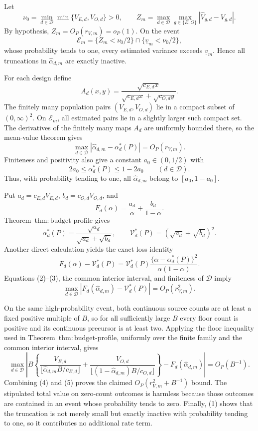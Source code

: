 Let
\[
 \nu_0=\min_{d\in\mathcal D}\min\{V_{E,d},V_{O,d}\}>0,
 \qquad
 Z_m=\max_{d\in\mathcal D}\max_{g\in\{E,O\}}
 |\widehat V_{g,d}-V_{g,d}|.
\]
By hypothesis, \(Z_m=O_P(r_{V,m})=o_P(1)\).  On the event
\[
 \mathcal E_m=\{Z_m<\nu_0/2\}\cap\{\underline v_m<\nu_0/2\}, \tag{1}
\]
whose probability tends to one, every estimated variance exceeds \(\underline v_m\).  Hence all truncations in \(\widehat\alpha_{d,m}\) are exactly inactive.

For each design define
\[
 A_d(x,y)=\frac{\sqrt{c_{E,d}x}}
 {\sqrt{c_{E,d}x}+\sqrt{c_{O,d}y}}.
\]
The finitely many population pairs \((V_{E,d},V_{O,d})\) lie in a compact subset of \((0,\infty)^2\).  On \(\mathcal E_m\), all estimated pairs lie in a slightly larger such compact set.  The derivatives of the finitely many maps \(A_d\) are uniformly bounded there, so the mean-value theorem gives
\[
 \max_{d\in\mathcal D}
 |\widehat\alpha_{d,m}-\alpha_d^*(P)|=O_P(r_{V,m}).       \tag{2}
\]
Finiteness and positivity also give a constant \(a_0\in(0,1/2)\) with
\[
 2a_0\le\alpha_d^*(P)\le1-2a_0
 \qquad(d\in\mathcal D).
\]
Thus, with probability tending to one, all \(\widehat\alpha_{d,m}\) belong to \([a_0,1-a_0]\).

Put \(a_d=c_{E,d}V_{E,d}\), \(b_d=c_{O,d}V_{O,d}\), and
\[
 F_d(\alpha)=\frac{a_d}{\alpha}+\frac{b_d}{1-\alpha}.
\]
Theorem~\(\mathrm{thm{:}budget\text{-}profile}\) gives
\[
 \alpha_d^*(P)=\frac{\sqrt{a_d}}{\sqrt{a_d}+\sqrt{b_d}},
 \qquad
 \mathcal V_d^*(P)=(\sqrt{a_d}+\sqrt{b_d})^2.
\]
Another direct calculation yields the exact loss identity
\[
 F_d(\alpha)-\mathcal V_d^*(P)
 =\mathcal V_d^*(P)
 \frac{\{\alpha-\alpha_d^*(P)\}^2}{\alpha(1-\alpha)}.    \tag{3}
\]
Equations (2)--(3), the common interior interval, and finiteness of \(\mathcal D\) imply
\[
 \max_{d\in\mathcal D}
 |F_d(\widehat\alpha_{d,m})-\mathcal V_d^*(P)|
 =O_P(r_{V,m}^2).                                      \tag{4}
\]

On the same high-probability event, both continuous source counts are at least a fixed positive multiple of \(B\), so for all sufficiently large \(B\) every floor count is positive and its continuous precursor is at least two.  Applying the floor inequality used in Theorem~\(\mathrm{thm{:}budget\text{-}profile}\), uniformly over the finite family and the common interior interval, gives
\[
\max_{d\in\mathcal D}\left|
B\left\{
\frac{V_{E,d}}{\lfloor\widehat\alpha_{d,m}B/c_{E,d}\rfloor}
+\frac{V_{O,d}}{\lfloor(1-\widehat\alpha_{d,m})B/c_{O,d}\rfloor}
\right\}-F_d(\widehat\alpha_{d,m})\right|=O_P(B^{-1}). \tag{5}
\]
Combining (4) and (5) proves the claimed \(O_P(r_{V,m}^2+B^{-1})\) bound.  The stipulated total value on zero-count outcomes is harmless because those outcomes are contained in an event whose probability tends to zero.  Finally, (1) shows that the truncation is not merely small but exactly inactive with probability tending to one, so it contributes no additional rate term.